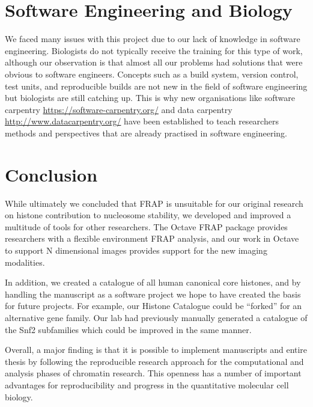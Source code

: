 \section{Software Engineering and Biology}

We faced many issues with this project due to our lack of knowledge in
software engineering.  Biologists do not typically receive the training for this
type of work, although our observation is that almost all our
problems had solutions that were obvious to software engineers.
Concepts such as a build system, version control, test units,
and reproducible builds are not new in the field of software engineering but
biologists are still catching up.  This is why new
organisations like software
carpentry \url{https://software-carpentry.org/} and data
carpentry \url{http://www.datacarpentry.org/} have been established to
teach researchers
methods and perspectives that are already practised in software engineering.

\section{Conclusion}

While ultimately we concluded that FRAP
is unsuitable for our original research on histone contribution to
nucleosome stability,
we developed
and improved a multitude of tools for other researchers.  The Octave
FRAP package provides researchers with a flexible environment FRAP
analysis, and our work in Octave to support N dimensional images
provides support for the new imaging modalities.

In addition, we created a catalogue of all human canonical core
histones, and by handling the manuscript as a software project we hope
to have created the basis for future projects.  For example, our
Histone Catalogue could be ``forked'' for an alternative gene family.
Our lab had previously manually generated a catalogue of the Snf2
subfamilies \citep{andrew-snf2-catalogue} which could be improved in
the same manner.

Overall, a major finding is that it is possible to implement
manuscripts and entire thesis by following the reproducible research
approach for the computational and analysis phases of chromatin
research.  This openness has a number of important advantages for
reproducibility and progress in the quantitative molecular cell biology.
